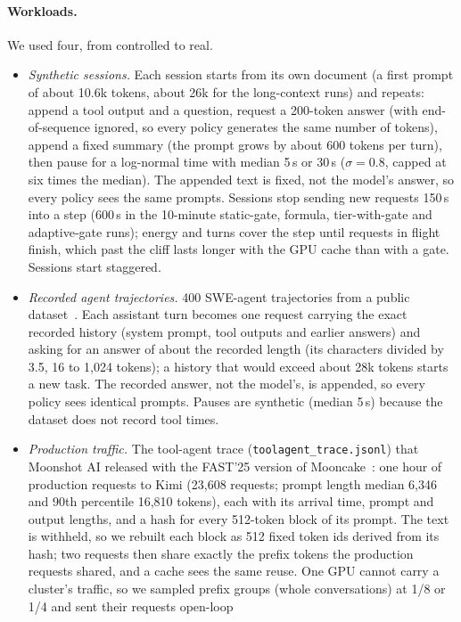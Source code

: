 \paragraph{Workloads.} We used four, from controlled to real.
\begin{itemize}
\item \emph{Synthetic sessions.} Each session starts from its own document (a first prompt of about 10.6k tokens, about
26k for the long-context runs) and repeats: append a tool output and a question, request a 200-token answer
(with end-of-sequence ignored, so every policy generates the same number of tokens), append a fixed summary (the prompt grows by about 600 tokens per turn), then pause for a
log-normal time with median 5\,s or 30\,s ($\sigma=0.8$, capped at six times the median). The appended text is fixed,
not the model's answer, so every policy sees the same prompts. Sessions stop sending new requests 150\,s into a step (600\,s in the 10-minute static-gate, formula, tier-with-gate and
adaptive-gate runs); energy and turns cover the step until requests in flight finish, which past the cliff lasts longer
with the GPU cache than with a gate. Sessions start staggered.
\item \emph{Recorded agent trajectories.} 400 SWE-agent trajectories from a public dataset~\cite{nebius2024swetraj}. Each
assistant turn becomes one request carrying the exact recorded history (system prompt, tool outputs and earlier
answers) and asking for an answer of about the recorded length (its characters divided by 3.5, 16 to 1,024 tokens); a
history that would exceed about 28k tokens starts a new task. The recorded answer, not the model's, is appended, so every
policy sees identical prompts. Pauses are synthetic (median 5\,s) because the dataset does not record tool times.
\item \emph{Production traffic.} The tool-agent trace (\texttt{toolagent\_trace.jsonl}) that Moonshot AI released with the FAST'25 version of Mooncake~\cite{qin2025mooncakefast}:
one hour of production requests to Kimi (23,608 requests; prompt length median 6,346 and 90th percentile 16,810
tokens), each with its arrival time, prompt and output lengths, and a hash for every 512-token block of its prompt.
The text is withheld, so we rebuilt each block as 512 fixed token ids derived from its hash; two requests then share
exactly the prefix tokens the production requests shared, and a cache sees the same reuse. One GPU cannot carry a
cluster's traffic, so we sampled prefix groups (whole conversations) at 1/8 or 1/4 and sent their requests open-loop

\end{itemize}
